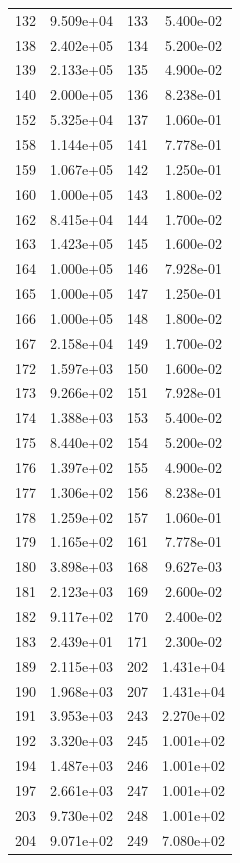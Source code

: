 \documentclass[12pt]{article}
\begin{document}
\begin{longtable}{@{}cccc@{}}
132 & 9.509e+04 & 133 & 5.400e-02 \\
138 & 2.402e+05 & 134 & 5.200e-02 \\
139 & 2.133e+05 & 135 & 4.900e-02 \\
140 & 2.000e+05 & 136 & 8.238e-01 \\
152 & 5.325e+04 & 137 & 1.060e-01 \\
158 & 1.144e+05 & 141 & 7.778e-01 \\
159 & 1.067e+05 & 142 & 1.250e-01 \\
160 & 1.000e+05 & 143 & 1.800e-02 \\
162 & 8.415e+04 & 144 & 1.700e-02 \\
163 & 1.423e+05 & 145 & 1.600e-02 \\
164 & 1.000e+05 & 146 & 7.928e-01 \\
165 & 1.000e+05 & 147 & 1.250e-01 \\
166 & 1.000e+05 & 148 & 1.800e-02 \\
167 & 2.158e+04 & 149 & 1.700e-02 \\
172 & 1.597e+03 & 150 & 1.600e-02 \\
173 & 9.266e+02 & 151 & 7.928e-01 \\
174 & 1.388e+03 & 153 & 5.400e-02 \\
175 & 8.440e+02 & 154 & 5.200e-02 \\
176 & 1.397e+02 & 155 & 4.900e-02 \\
177 & 1.306e+02 & 156 & 8.238e-01 \\
178 & 1.259e+02 & 157 & 1.060e-01 \\
179 & 1.165e+02 & 161 & 7.778e-01 \\
180 & 3.898e+03 & 168 & 9.627e-03 \\
181 & 2.123e+03 & 169 & 2.600e-02 \\
182 & 9.117e+02 & 170 & 2.400e-02 \\
183 & 2.439e+01 & 171 & 2.300e-02 \\
189 & 2.115e+03 & 202 & 1.431e+04 \\
190 & 1.968e+03 & 207 & 1.431e+04 \\
191 & 3.953e+03 & 243 & 2.270e+02 \\
192 & 3.320e+03 & 245 & 1.001e+02 \\
194 & 1.487e+03 & 246 & 1.001e+02 \\
197 & 2.661e+03 & 247 & 1.001e+02 \\
203 & 9.730e+02 & 248 & 1.001e+02 \\
204 & 9.071e+02 & 249 & 7.080e+02 \\

\end{longtable}
\end{document}

